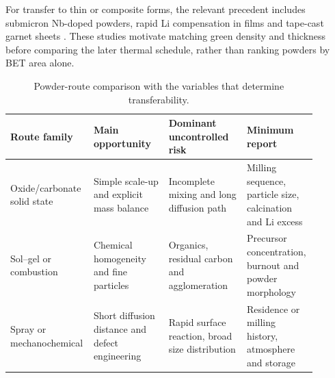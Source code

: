 For transfer to thin or composite forms, the relevant precedent includes submicron Nb-doped powders, rapid Li compensation in films and tape-cast garnet sheets \cite{yan2020submicron,xiang2023rapid,jonson2018tape,teng2013recent}. These studies motivate matching green density and thickness before comparing the later thermal schedule, rather than ranking powders by BET area alone.

\begin{table}[t]
\centering
\caption{Powder-route comparison with the variables that determine transferability.}
\label{tab:powder}
\begin{tabular}{P{0.20\linewidth}P{0.24\linewidth}P{0.25\linewidth}P{0.20\linewidth}}
\toprule
Route family & Main opportunity & Dominant uncontrolled risk & Minimum report \\
\midrule
Oxide/carbonate solid state & Simple scale-up and explicit mass balance & Incomplete mixing and long diffusion path & Milling sequence, particle size, calcination and Li excess \cite{heywood2023tailoring,kosir2022comparative} \\
Sol--gel or combustion & Chemical homogeneity and fine particles & Organics, residual carbon and agglomeration & Precursor concentration, burnout and powder morphology \cite{alizadeh2023synthesis,djenadic2014nebulized} \\
Spray or mechanochemical & Short diffusion distance and defect engineering & Rapid surface reaction, broad size distribution & Residence or milling history, atmosphere and storage \cite{ali2021spray,duvel2012mechanosynthesis,hoinkis2023particle} \\
\bottomrule
\end{tabular}
\end{table}
